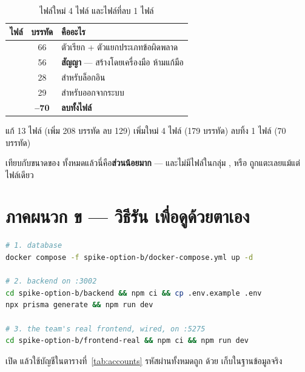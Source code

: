 \begin{table}[htbp]
\centering
\footnotesize\sansall
\caption{ไฟล์ใหม่ 4 ไฟล์ และไฟล์ที่ลบ 1 ไฟล์}
\label{tab:diffnew}
\begin{tabular}{@{}L{5.4cm}cL{6.4cm}@{}}
\toprule
\textbf{ไฟล์} & \textbf{บรรทัด} & \textbf{คืออะไร} \\
\midrule
{} & 66 & ตัวเรียก  + ตัวแยกประเภทข้อผิดพลาด \\
 & 56 & \textbf{สัญญา} --- สร้างโดยเครื่องมือ ห้ามแก้มือ \\
 & 28 &  สำหรับล็อกอิน \\
 & 29 &  สำหรับออกจากระบบ \\
\midrule
{} & \textbf{--70} & \textbf{ลบทั้งไฟล์} \\
\bottomrule
\end{tabular}
\end{table}

\begin{keybox}[title={ตัวเลขรวมที่ควรจำ}]
แก้ 13 ไฟล์ (เพิ่ม 208 บรรทัด ลบ 129) เพิ่มใหม่ 4 ไฟล์ (179 บรรทัด)
ลบทิ้ง 1 ไฟล์ (70 บรรทัด)

เทียบกับขนาดของ  ทั้งหมดแล้วนี่คือ\textbf{ส่วนน้อยมาก}
--- และไม่มีไฟล์ในกลุ่ม , 
หรือ  ถูกแตะเลยแม้แต่ไฟล์เดียว
\end{keybox}

\section*{ภาคผนวก ข --- วิธีรัน  เพื่อดูด้วยตาเอง}

\begin{lstlisting}[language=bash]
# 1. database
docker compose -f spike-option-b/docker-compose.yml up -d

# 2. backend on :3002
cd spike-option-b/backend && npm ci && cp .env.example .env
npx prisma generate && npm run dev

# 3. the team's real frontend, wired, on :5275
cd spike-option-b/frontend-real && npm ci && npm run dev
\end{lstlisting}

เปิด  แล้วใช้บัญชีในตารางที่~\ref{tab:accounts}
รหัสผ่านทั้งหมดถูก  ด้วย  เก็บในฐานข้อมูลจริง


